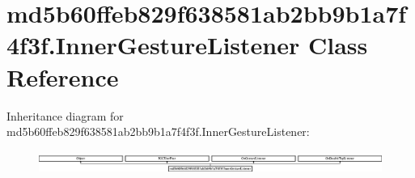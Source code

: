 \hypertarget{classmd5b60ffeb829f638581ab2bb9b1a7f4f3f_1_1InnerGestureListener}{}\section{md5b60ffeb829f638581ab2bb9b1a7f4f3f.\+Inner\+Gesture\+Listener Class Reference}
\label{classmd5b60ffeb829f638581ab2bb9b1a7f4f3f_1_1InnerGestureListener}
Inheritance diagram for md5b60ffeb829f638581ab2bb9b1a7f4f3f.\+Inner\+Gesture\+Listener\+:\begin{figure}[H]
\begin{center}
\leavevmode
\includegraphics[height=0.754717cm]{classmd5b60ffeb829f638581ab2bb9b1a7f4f3f_1_1InnerGestureListener}
\end{center}
\end{figure}
